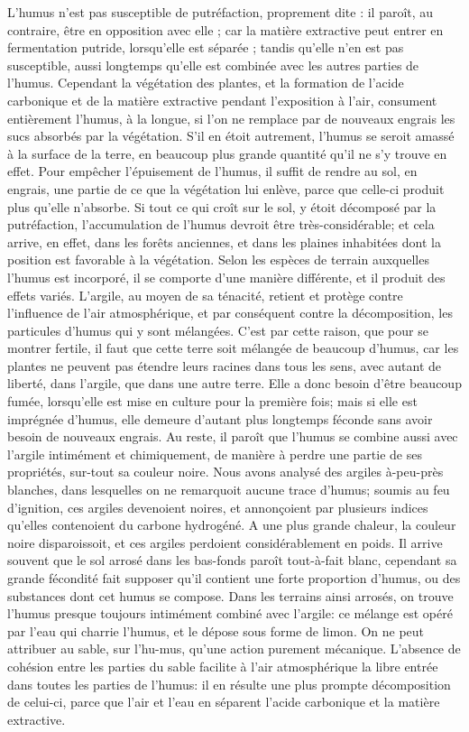 L'humus n'est pas susceptible de putréfaction, proprement dite : il paroît, au contraire, être en opposition avec elle ; car la matière extractive peut entrer en fermentation putride, lorsqu'elle est séparée ; tandis qu'elle n'en est pas susceptible, aussi longtemps qu'elle est combinée avec les autres parties de l'humus. Cependant la végétation des plantes, et la formation de l'acide carbonique et de la matière extractive pendant l'exposition à l'air, consument entièrement l'humus, à la longue, si l'on ne remplace\setcounter{page}{63} par de nouveaux engrais les sucs absorbés par la végétation. S'il en étoit autrement, l'humus se seroit amassé à la surface de la terre, en beaucoup plus grande quantité qu'il ne s'y trouve en effet. Pour empêcher l'épuisement de l'humus, il suffit de rendre au sol, en engrais, une partie de ce que la végétation lui enlève, parce que celle-ci produit plus qu'elle n'absorbe. Si tout ce qui croît sur le sol, y étoit décomposé par la putréfaction, l'accumulation de l'humus devroit être très-considérable; et cela arrive, en effet, dans les forêts anciennes, et dans les plaines inhabitées dont la position est favorable à la végétation.
Selon les espèces de terrain auxquelles l'humus est incorporé, il se comporte d'une manière différente, et il produit des effets variés. L'argile, au moyen de sa ténacité, retient et protège contre l'influence de l'air atmosphérique, et par conséquent contre la décomposition, les particules d'humus qui y sont mélangées. C'est par cette raison, que pour se montrer fertile, il faut que cette terre soit mélangée de beaucoup d'humus, car les plantes ne peuvent pas étendre leurs racines dans tous les sens, avec autant de liberté, dans l'argile, que dans une autre\setcounter{page}{64} terre. Elle a donc besoin d'être beaucoup fumée, lorsqu'elle est mise en culture pour la première fois; mais si elle est imprégnée d'humus, elle demeure d'autant plus longtemps féconde sans avoir besoin de nouveaux engrais. Au reste, il paroît que l'humus se combine aussi avec l'argile intimément et chimiquement, de manière à perdre une partie de ses propriétés, sur-tout sa couleur noire. Nous avons analysé des argiles à-peu-près blanches, dans lesquelles on ne remarquoit aucune trace d'humus; soumis au feu d'ignition, ces argiles devenoient noires, et annonçoient par plusieurs indices qu'elles contenoient du carbone hydrogéné. A une plus grande chaleur, la couleur noire disparoissoit, et ces argiles perdoient considérablement en poids. Il arrive souvent que le sol arrosé dans les bas-fonds paroît tout-à-fait blanc, cependant sa grande fécondité fait supposer qu'il contient une forte proportion d'humus, ou des substances dont cet humus se compose. Dans les terrains ainsi arrosés, on trouve l'humus presque toujours intimément combiné avec l'argile: ce mélange est opéré par l'eau qui charrie l'humus, et le dépose sous forme de limon.\setcounter{page}{65} On ne peut attribuer au sable, sur l'hu-mus, qu'une action purement mécanique. L'absence de cohésion entre les parties du sable facilite à l'air atmosphérique la libre entrée dans toutes les parties de l'humus: il en résulte une plus prompte décomposition de celui-ci, parce que l'air et l'eau en séparent l'acide carbonique et la matière extractive.
